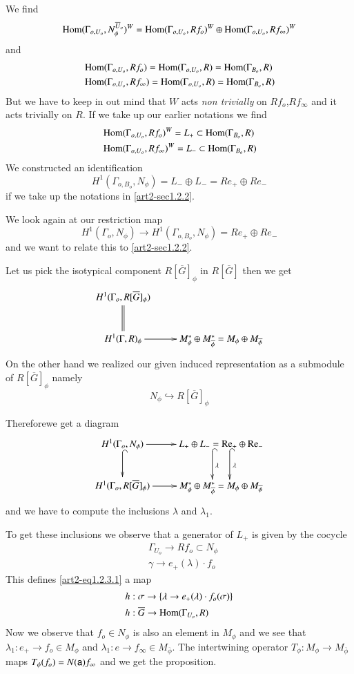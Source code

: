 We find
$$
\operatorname{Hom} (\Gamma_{o,U_{o}},N^{\overline{U}_{o}}_{\phi})^{W}=\operatorname{Hom}(\Gamma_{o,U_{o}},Rf_{o})^{W}\oplus \operatorname{Hom}(\Gamma_{o,U_{o}},Rf_{\infty})^{W}
$$
and
\begin{align*}
&\operatorname{Hom}(\Gamma_{o,U_{o}},Rf_{o})=\operatorname{Hom}(\Gamma_{o,U_{o}},R)=\operatorname{Hom}(\Gamma_{B_{o}},R)\\
&\operatorname{Hom}(\Gamma_{o,U_{o}},Rf_{\infty})=\operatorname{Hom}(\Gamma_{o,U_{o}},R)=\operatorname{Hom}(\Gamma_{B_{o}},R)
\end{align*}
But we have to keep in out mind that $W$ acts {\em non trivially} on $Rf_{o}$,\break $Rf_{\infty}$ and it acts trivially on $R$. If we take up our earlier notations we find
\begin{align*}
&\operatorname{Hom}(\Gamma_{o,U_{o}},Rf_{o})^{W}=L_{+}\subset \operatorname{Hom}(\Gamma_{B_{o}},R)\\
&\operatorname{Hom}(\Gamma_{o,U_{o}},Rf_{\infty})^{W}=L_{-}\subset \operatorname{Hom}(\Gamma_{B_{o}},R)
\end{align*}
We constructed an identification
$$
H^{1}(\Gamma_{o,B_{o}},N_{\phi})=L_{-}\oplus L_{-}=Re_{+}\oplus Re_{-}
$$
if we take up the notations in \ref{art2-sec1.2.2}.

We look again at our restriction map
$$
H^{1}(\Gamma_{o},N_{\phi})\to H^{1}(\Gamma_{o,B_{o}},N_{\phi})=Re_{+}\oplus Re_{-}
$$
and we want to relate this to \ref{art2-sec1.2.2}.

Let us pick the isotypical component $R[\overline{G}]_{\phi}$ in $R[\overline{G}]$ then we get
$$
\xymatrix{
H^{1}(\Gamma_{o},R[\overline{G}]_{\phi})\ar@{=}[d] &\\
H^{1}(\Gamma,R)_{\phi}\ar[r] & M^{*}_{\phi}\oplus M^{*}_{\overline{\phi}}=M_{\phi}\oplus M_{\overline{\phi}}
}
$$
On the other hand we realized our given induced representation as a submodule of $R[\overline{G}]_{\phi}$ namely
$$
N_{\phi}\hookrightarrow R[\overline{G}]_{\phi}
$$

Therefore\pageoriginale we get a diagram
\[
\xymatrix{
H^{1}(\Gamma_{o},N_{\phi})\ar[r]\ar@{^(->}[d] & L_{+}\oplus L_{-}=\rRe_{+}\oplus\rRe_{-}\ar@<2ex>@{^(->}[d]^{\lambda}\ar@<-2ex>@{^(->}[d]^{\lambda}\\
H^{1}(\Gamma_{o},R[\overline{G}]_{\phi})\ar[r] & M^{*}_{\phi}\oplus M^{*}_{\overline{\phi}}=M_{\phi}\oplus M_{\overline{\phi}}
}
\]
and we have to compute the inclusions $\lambda$ and $\lambda_{1}$.

To get these inclusions we observe that a generator of $L_{+}$ is given by the cocycle
\begin{align*}
& \Gamma_{U_{o}}\to Rf_{o}\subset N_{\phi}\\
& \gamma\to e_{+}(\lambda)\cdot f_{o}
\end{align*}
This defines \eqref{art2-eq1.2.3.1} a map
\begin{align*}
& h:\sigma \to \{\lambda\to e_{+}(\lambda)\cdot f_{o}(\sigma)\}\\
& h:\overline{G}\to \operatorname{Hom}(\Gamma_{U_{o}},R)
\end{align*}
Now we observe that $f_{o}\in N_{\phi}$ is also an element in $M_{\phi}$ and we see that $\lambda_{1}:e_{+}\to f_{o}\in M_{\phi}$ and $\lambda_{1}:e\to f_{\infty}\in M_{\overline{\phi}}$. The intertwining operator $T_{\phi}:M_{\phi}\to M_{\overline{\phi}}$ maps $T_{\phi}(f_{o})=N(\mathsf{a})f_{\infty}$ and we get the proposition.

